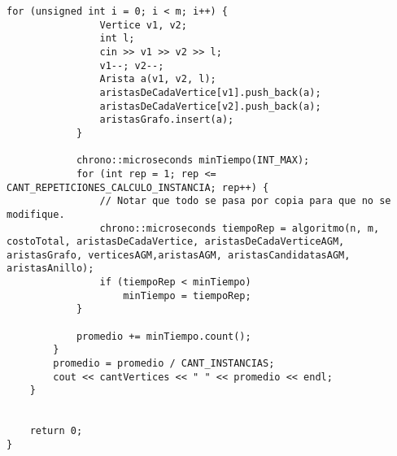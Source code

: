 \begin{lstlisting}[frame=single]
            for (unsigned int i = 0; i < m; i++) {
                Vertice v1, v2;
                int l;
                cin >> v1 >> v2 >> l;
                v1--; v2--;
                Arista a(v1, v2, l);
                aristasDeCadaVertice[v1].push_back(a);
                aristasDeCadaVertice[v2].push_back(a);
                aristasGrafo.insert(a);
            }
            
            chrono::microseconds minTiempo(INT_MAX);
            for (int rep = 1; rep <= CANT_REPETICIONES_CALCULO_INSTANCIA; rep++) {
                // Notar que todo se pasa por copia para que no se modifique.
                chrono::microseconds tiempoRep = algoritmo(n, m, costoTotal, aristasDeCadaVertice, aristasDeCadaVerticeAGM, aristasGrafo, verticesAGM,aristasAGM, aristasCandidatasAGM, aristasAnillo);
                if (tiempoRep < minTiempo)
                    minTiempo = tiempoRep;
            }
            
            promedio += minTiempo.count();
        }
        promedio = promedio / CANT_INSTANCIAS;
        cout << cantVertices << " " << promedio << endl;
    }
    
    
    return 0;
}
\end{lstlisting}
